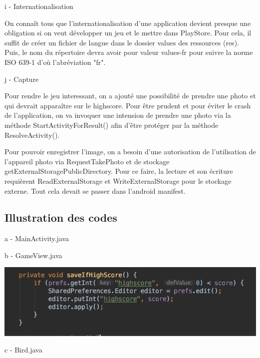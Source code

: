 \documentclass{rapportECL}
\begin{document}
i - Internationalisation

On connaît tous que l'internationalisation d'une application devient presque une obligation si on veut développer un jeu et le mettre dans PlayStore. Pour cela, il suffit de créer un fichier de langue dans le dossier values des ressources (res). Puis, le nom du répertoire devra avoir pour valeur values-fr pour suivre la norme ISO 639-1 d'où l'abréviation "fr".\newline

j - Capture

Pour rendre le jeu interessant, on a ajouté une possibilité de prendre une photo et qui devrait apparaître sur le highscore. Pour être prudent et pour éviter le crash de l'application, on va invoquer une intension de prendre une photo via la méthode StartActivityForResult()\cite{AndroidStudio} afin d'être protéger par la méthode ResolveActivity().

Pour pouvoir enregistrer l'image, on a besoin d'une autorisation de l'utilisation de l'appareil photo via RequestTakePhoto\cite{AndroidStudio} et de stockage getExternalStoragePublicDirectory. Pour ce faire, la lecture et son écriture requièrent ReadExternalStorage et WriteExternalStorage pour le stockage externe. Tout cela devait se passer dans l'android manifest.\newline

\subsection{Illustration des codes}

a - MainActivity.java


b - GameView.java 

\begin{center}
    \includegraphics[scale = 0.5]{logos/GameView.png}
\end{center}

c - Bird.java
\end{document}
